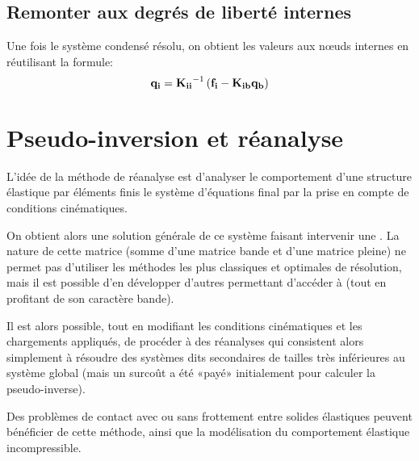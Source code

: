 \medskip
\subsection{Remonter aux degrés de liberté internes}

Une fois le système condensé résolu, on obtient les valeurs aux nœuds internes en réutilisant la formule:
\begin{equation}
\VV{q_i} = \MMI{K_{ii}}\left(\VV{f_i}-\MM{K_{ib}}\VV{q_b}\right)
\end{equation}

\medskip
\section{Pseudo-inversion et réanalyse}\label{Sec-PInv}


\medskip
L'idée de la méthode de réanalyse est d'analyser le comportement d'une structure élastique par éléments finis  le système d'équations final par la prise en compte de conditions cinématiques.

On obtient alors une solution générale de ce système faisant intervenir une . La nature de cette matrice (somme d'une matrice bande et d'une matrice pleine) ne permet pas d'utiliser les méthodes les plus classiques et optimales de résolution, mais il est possible d'en développer d'autres permettant d'accéder à  (tout en profitant de son caractère bande).

Il est alors possible, tout en modifiant les conditions cinématiques et les chargements appliqués, de procéder à des réanalyses qui consistent alors simplement à résoudre des systèmes dits secondaires de tailles très inférieures au système global (mais un surcoût a été «payé» initialement pour calculer la pseudo-inverse).

Des problèmes de contact avec ou sans frottement entre solides élastiques peuvent bénéficier de cette méthode, ainsi que la modélisation du comportement élastique incompressible.

